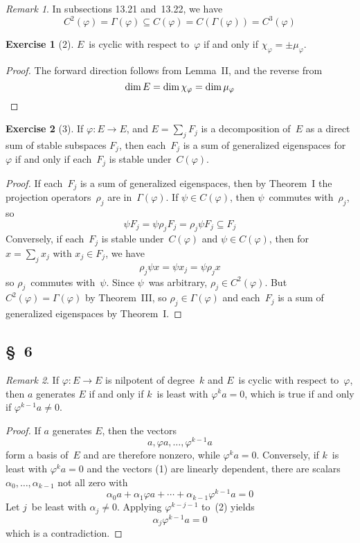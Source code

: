 \documentclass[letterpaper,12pt]{article}
\theoremstyle{definition}
\newtheorem*{exer}{Exercise}
\theoremstyle{remark}
\newtheorem*{rmk}{Remark}
\begin{document}
\begin{rmk}
In subsections 13.21 and~13.22, we have
\[C^2(\varphi)=\Gamma(\varphi)\subseteq C(\varphi)=C(\Gamma(\varphi))=C^3(\varphi)\]
\end{rmk}

\begin{exer}[2]
\(E\)~is cyclic with respect to~\(\varphi\) if and only if \(\chi_{\varphi}=\pm\mu_{\varphi}\).
\end{exer}
\begin{proof}
The forward direction follows from Lemma~II, and the reverse from
\[\dim E=\dim\chi_{\varphi}=\dim\mu_{\varphi}\qedhere\]
\end{proof}

\begin{exer}[3]
If \(\varphi:E\to E\), and \(E=\sum_j F_j\) is a decomposition of~\(E\) as a direct sum of stable subspaces \(F_j\), then each~\(F_j\) is a sum of generalized eigenspaces for~\(\varphi\) if and only if each~\(F_j\) is stable under~\(C(\varphi)\).
\end{exer}
\begin{proof}
If each~\(F_j\) is a sum of generalized eigenspaces, then by Theorem~I the projection operators~\(\rho_j\) are in~\(\Gamma(\varphi)\). If \(\psi\in C(\varphi)\), then \(\psi\)~commutes with~\(\rho_j\), so
\[\psi F_j=\psi\rho_j F_j=\rho_j\psi F_j\subseteq F_j\]
Conversely, if each~\(F_j\) is stable under~\(C(\varphi)\) and \(\psi\in C(\varphi)\), then for \(x=\sum_j x_j\) with \(x_j\in F_j\), we have
\[\rho_j\psi x=\psi x_j=\psi\rho_j x\]
so \(\rho_j\)~commutes with~\(\psi\). Since \(\psi\)~was arbitrary, \(\rho_j\in C^2(\varphi)\). But \(C^2(\varphi)=\Gamma(\varphi)\) by Theorem~III, so \(\rho_j\in\Gamma(\varphi)\) and each~\(F_j\) is a sum of generalized eigenspaces by Theorem~I.
\end{proof}

\subsection*{\S~6}
\begin{rmk}
If \(\varphi:E\to E\) is nilpotent of degree~\(k\) and \(E\)~is cyclic with respect to~\(\varphi\), then \(a\) generates \(E\) if and only if \(k\)~is least with \(\varphi^k a=0\), which is true if and only if \(\varphi^{k-1}a\ne 0\).
\end{rmk}
\begin{proof}
If \(a\) generates \(E\), then the vectors
\[a,\varphi a,\ldots,\varphi^{k-1}a\tag{1}\]
form a basis of~\(E\) and are therefore nonzero, while \(\varphi^k a=0\). Conversely, if \(k\)~is least with \(\varphi^k a=0\) and the vectors (1) are linearly dependent, there are scalars \(\alpha_0,\ldots,\alpha_{k-1}\) not all zero with
\[\alpha_0a+\alpha_1\varphi a+\cdots+\alpha_{k-1}\varphi^{k-1}a=0\tag{2}\]
Let \(j\)~be least with \(\alpha_j\ne 0\). Applying \(\varphi^{k-j-1}\) to~(2) yields
\[\alpha_j\varphi^{k-1}a=0\]
which is a contradiction.
\end{proof}
\end{document}
